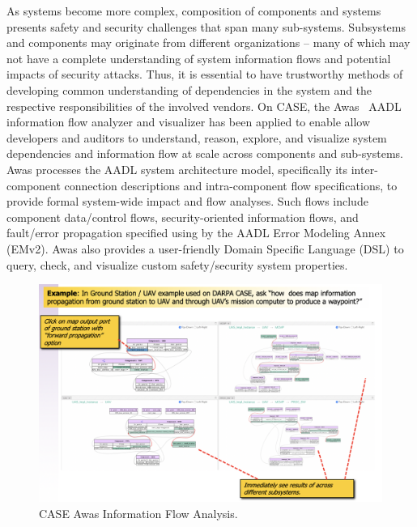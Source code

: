 
As systems become more complex, composition of components and 
systems presents safety and security challenges that span
many sub-systems.  Subsystems and components may originate from
different organizations -- many of which may not have a complete
understanding of system information flows and potential impacts of
security attacks.  Thus, it is essential to have trustworthy methods
of developing common understanding of dependencies in the system and
the respective responsibilities of the involved vendors.  On CASE, the
Awas~\cite{awas} AADL information flow analyzer and visualizer has been 
applied to enable allow developers and auditors to understand, reason,
explore, and visualize system dependencies and information flow at
scale across components and sub-systems.  Awas processes the AADL
system architecture model, specifically its inter-component connection
descriptions and intra-component flow specifications, to provide
formal system-wide impact and flow analyses.
Such flows include component data/control flows,
security-oriented information flows, and fault/error propagation
specified using by the AADL Error Modeling Annex (EMv2).
Awas also provides a user-friendly Domain Specific Language (DSL) to 
query, check, and visualize custom safety/security system properties.

\begin{figure}[h]
	\centering
	\includegraphics[width=\columnwidth]{figs/CASE-Awas.png}
	\caption{CASE Awas Information Flow Analysis.} 
	\label{fig:CASE-Awas} 
\end{figure}

